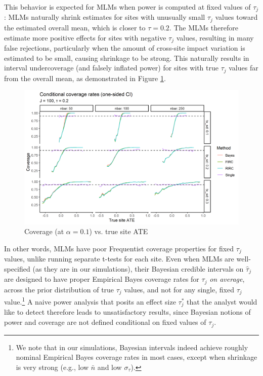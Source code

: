 \documentclass[]{article}
\begin{document}
This behavior is expected for MLMs when power is computed at fixed values of $\tau_j$: MLMs naturally shrink estimates for sites with unusually small $\tau_j$ values toward the estimated overall mean, which is closer to $\tau = 0.2$.
The MLMs therefore estimate more positive effects for sites with negative $\tau_j$ values, resulting in many false rejections, particularly when the amount of cross-site impact variation is estimated to be small, causing shrinkage to be strong.
This naturally results in interval undercoverage (and falsely inflated power) for sites with true $\tau_j$ values far from the overall mean, as demonstrated in Figure \ref{fig:coverage_plot}.
\begin{figure}[ht]
	\centering
	\includegraphics[width=\textwidth]{writeup/images/coverage_plot.png}
	\caption{Coverage (at $\alpha = 0.1$) vs. true site ATE}
	\label{fig:coverage_plot}
\end{figure}

In other words, MLMs have poor Frequentist coverage properties for fixed $\tau_j$ values, unlike running separate t-tests for each site.
Even when MLMs are well-specified (as they are in our simulations), their Bayesian credible intervals on $\hat{\tau}_j$ are designed to have proper Empirical Bayes coverage rates for $\tau_j$ \textit{on average}, across the prior distribution of true $\tau_j$ values, and not for any single, fixed $\tau_j$ value.\footnote{We note that in our simulations, Bayesian intervals indeed achieve roughly nominal Empirical Bayes coverage rates in most cases, except when shrinkage is very strong (e.g., low $\bar{n}$ and low $\sigma_\tau$).}
A naive power analysis that posits an effect size $\tau_j^*$ that the analyst would like to detect therefore leads to unsatisfactory results, since Bayesian notions of power and coverage are not defined conditional on fixed values of $\tau_j$.
\end{document}
